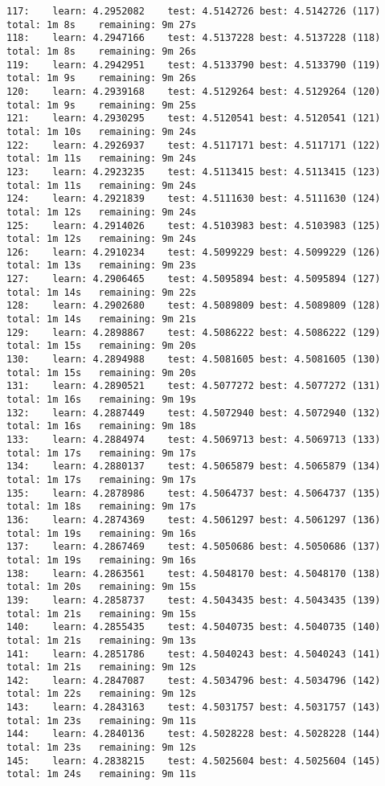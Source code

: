 \documentclass[11pt]{article}
\begin{document}
\begin{Verbatim}[commandchars=\\\{\}]
117:	learn: 4.2952082	test: 4.5142726	best: 4.5142726 (117)	total: 1m 8s	remaining: 9m 27s
118:	learn: 4.2947166	test: 4.5137228	best: 4.5137228 (118)	total: 1m 8s	remaining: 9m 26s
119:	learn: 4.2942951	test: 4.5133790	best: 4.5133790 (119)	total: 1m 9s	remaining: 9m 26s
120:	learn: 4.2939168	test: 4.5129264	best: 4.5129264 (120)	total: 1m 9s	remaining: 9m 25s
121:	learn: 4.2930295	test: 4.5120541	best: 4.5120541 (121)	total: 1m 10s	remaining: 9m 24s
122:	learn: 4.2926937	test: 4.5117171	best: 4.5117171 (122)	total: 1m 11s	remaining: 9m 24s
123:	learn: 4.2923235	test: 4.5113415	best: 4.5113415 (123)	total: 1m 11s	remaining: 9m 24s
124:	learn: 4.2921839	test: 4.5111630	best: 4.5111630 (124)	total: 1m 12s	remaining: 9m 24s
125:	learn: 4.2914026	test: 4.5103983	best: 4.5103983 (125)	total: 1m 12s	remaining: 9m 24s
126:	learn: 4.2910234	test: 4.5099229	best: 4.5099229 (126)	total: 1m 13s	remaining: 9m 23s
127:	learn: 4.2906465	test: 4.5095894	best: 4.5095894 (127)	total: 1m 14s	remaining: 9m 22s
128:	learn: 4.2902680	test: 4.5089809	best: 4.5089809 (128)	total: 1m 14s	remaining: 9m 21s
129:	learn: 4.2898867	test: 4.5086222	best: 4.5086222 (129)	total: 1m 15s	remaining: 9m 20s
130:	learn: 4.2894988	test: 4.5081605	best: 4.5081605 (130)	total: 1m 15s	remaining: 9m 20s
131:	learn: 4.2890521	test: 4.5077272	best: 4.5077272 (131)	total: 1m 16s	remaining: 9m 19s
132:	learn: 4.2887449	test: 4.5072940	best: 4.5072940 (132)	total: 1m 16s	remaining: 9m 18s
133:	learn: 4.2884974	test: 4.5069713	best: 4.5069713 (133)	total: 1m 17s	remaining: 9m 17s
134:	learn: 4.2880137	test: 4.5065879	best: 4.5065879 (134)	total: 1m 17s	remaining: 9m 17s
135:	learn: 4.2878986	test: 4.5064737	best: 4.5064737 (135)	total: 1m 18s	remaining: 9m 17s
136:	learn: 4.2874369	test: 4.5061297	best: 4.5061297 (136)	total: 1m 19s	remaining: 9m 16s
137:	learn: 4.2867469	test: 4.5050686	best: 4.5050686 (137)	total: 1m 19s	remaining: 9m 16s
138:	learn: 4.2863561	test: 4.5048170	best: 4.5048170 (138)	total: 1m 20s	remaining: 9m 15s
139:	learn: 4.2858737	test: 4.5043435	best: 4.5043435 (139)	total: 1m 21s	remaining: 9m 15s
140:	learn: 4.2855435	test: 4.5040735	best: 4.5040735 (140)	total: 1m 21s	remaining: 9m 13s
141:	learn: 4.2851786	test: 4.5040243	best: 4.5040243 (141)	total: 1m 21s	remaining: 9m 12s
142:	learn: 4.2847087	test: 4.5034796	best: 4.5034796 (142)	total: 1m 22s	remaining: 9m 12s
143:	learn: 4.2843163	test: 4.5031757	best: 4.5031757 (143)	total: 1m 23s	remaining: 9m 11s
144:	learn: 4.2840136	test: 4.5028228	best: 4.5028228 (144)	total: 1m 23s	remaining: 9m 12s
145:	learn: 4.2838215	test: 4.5025604	best: 4.5025604 (145)	total: 1m 24s	remaining: 9m 11s

\end{Verbatim}
\end{document}
